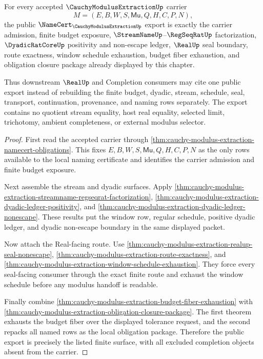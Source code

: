 \begin{theorem}
\label{thm:cauchy-modulus-extraction-public-export}
For every accepted $\CauchyModulusExtractionUp$ carrier
$$
M=(E,B,W,S,\mathsf{Mu},Q,H,C,P,N),
$$
the public $\NameCert_{\CauchyModulusExtractionUp}$ export is exactly the carrier admission, finite budget exposure, $\StreamNameUp$--$\RegSeqRatUp$ factorization, $\DyadicRatCoreUp$ positivity and non-escape ledger, $\RealUp$ seal boundary, route exactness, window schedule exhaustion, budget fiber exhaustion, and obligation closure package already displayed by this chapter.

Thus downstream $\RealUp$ and Completion consumers may cite one public export instead of rebuilding the finite budget, dyadic, stream, schedule, seal, transport, continuation, provenance, and naming rows separately. The export contains no quotient stream equality, host real equality, selected limit, trichotomy, ambient completeness, or external modulus selector.
\end{theorem}
\begin{proof}
First read the accepted carrier through \autoref{thm:cauchy-modulus-extraction-namecert-obligations}. This fixes $E,B,W,S,\mathsf{Mu},Q,H,C,P,N$ as the only rows available to the local naming certificate and identifies the carrier admission and finite budget exposure.

Next assemble the stream and dyadic surfaces. Apply \autoref{thm:cauchy-modulus-extraction-streamname-regseqrat-factorization}, \autoref{thm:cauchy-modulus-extraction-dyadic-ledger-positivity}, and \autoref{thm:cauchy-modulus-extraction-dyadic-ledger-nonescape}. These results put the window row, regular schedule, positive dyadic ledger, and dyadic non-escape boundary in the same displayed packet.

Now attach the Real-facing route. Use \autoref{thm:cauchy-modulus-extraction-realup-seal-nonescape}, \autoref{thm:cauchy-modulus-extraction-route-exactness}, and \autoref{thm:cauchy-modulus-extraction-window-schedule-exhaustion}. They force every seal-facing consumer through the exact finite route and exhaust the window schedule before any modulus handoff is readable.

Finally combine \autoref{thm:cauchy-modulus-extraction-budget-fiber-exhaustion} with \autoref{thm:cauchy-modulus-extraction-obligation-closure-package}. The first theorem exhausts the budget fiber over the displayed tolerance request, and the second repacks all named rows as the local obligation package. Therefore the public export is precisely the listed finite surface, with all excluded completion objects absent from the carrier.
\end{proof}

